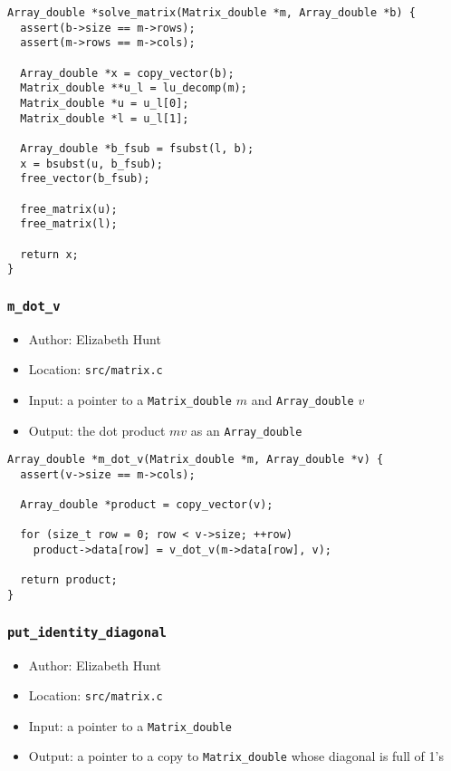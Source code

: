 \documentclass[11pt]{article}
\begin{document}
\begin{verbatim}
Array_double *solve_matrix(Matrix_double *m, Array_double *b) {
  assert(b->size == m->rows);
  assert(m->rows == m->cols);

  Array_double *x = copy_vector(b);
  Matrix_double **u_l = lu_decomp(m);
  Matrix_double *u = u_l[0];
  Matrix_double *l = u_l[1];

  Array_double *b_fsub = fsubst(l, b);
  x = bsubst(u, b_fsub);
  free_vector(b_fsub);

  free_matrix(u);
  free_matrix(l);

  return x;
}
\end{verbatim}

\subsubsection{\texttt{m\_dot\_v}}
\label{sec:orgae0f4c9}
\begin{itemize}
\item Author: Elizabeth Hunt
\item Location: \texttt{src/matrix.c}
\item Input: a pointer to a \texttt{Matrix\_double} \(m\) and \texttt{Array\_double} \(v\)
\item Output: the dot product \(mv\) as an \texttt{Array\_double}
\end{itemize}

\begin{verbatim}
Array_double *m_dot_v(Matrix_double *m, Array_double *v) {
  assert(v->size == m->cols);

  Array_double *product = copy_vector(v);

  for (size_t row = 0; row < v->size; ++row)
    product->data[row] = v_dot_v(m->data[row], v);

  return product;
}
\end{verbatim}

\subsubsection{\texttt{put\_identity\_diagonal}}
\label{sec:org6d84f6a}
\begin{itemize}
\item Author: Elizabeth Hunt
\item Location: \texttt{src/matrix.c}
\item Input: a pointer to a \texttt{Matrix\_double}
\item Output: a pointer to a copy to \texttt{Matrix\_double} whose diagonal is full of 1's
\end{itemize}
\end{document}
